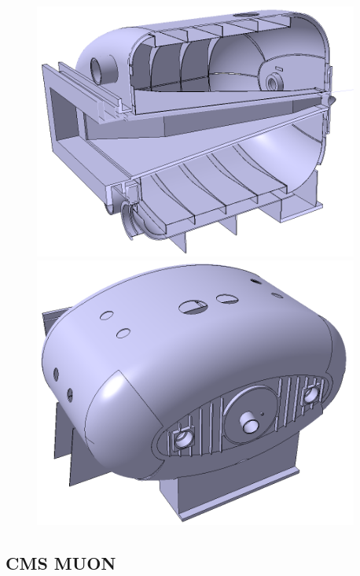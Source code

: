 \begin{figure}[H]
\begin{minipage}[b]{0.495\textwidth}
\includegraphics[width=0.95\textwidth]{pictures/GLAD3.png}
\caption{}
\label{fig:GLAD3}
\end{minipage}
\hspace{0.01\textwidth}
\begin{minipage}[b]{0.495\textwidth}
\includegraphics[width=0.95\textwidth]{pictures/GLAD4.png}
\caption{}
\label{fig:GLAD4}
\end{minipage}
\end{figure}

\subsection{CMS MUON}

